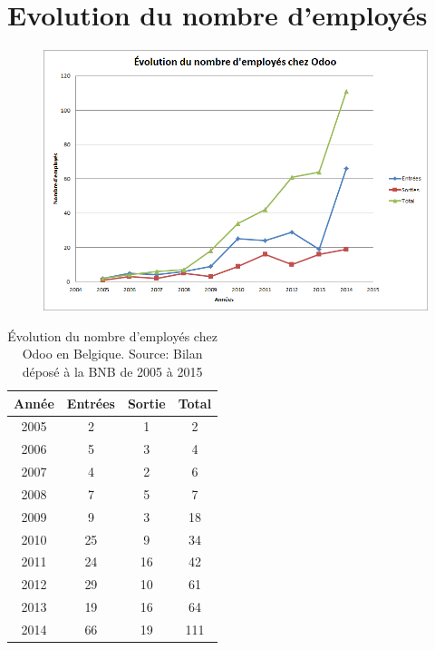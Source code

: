 \chapter{Evolution du nombre d'employés}
\begin{figure}[h!]
    \begin{center}
        \includegraphics[scale=0.6]{document/evolution.png}
        \caption{}
        \label{}
    \end{center}
\end{figure}
\begin{table}[ht!]
    \caption{ Évolution du nombre d'employés chez Odoo en Belgique. Source: Bilan déposé à la BNB de 2005 à 2015\cite{bnb}}
    \label{nb_employe}

    \begin{center}
        \begin{tabular}{|cccc|}
             \hline
             Année & Entrées & Sortie & Total \\
             \hline
             2005 & 2  & 1  & 2   \\
             2006 & 5  & 3  & 4   \\
             2007 & 4  & 2  & 6   \\
             2008 & 7  & 5  & 7   \\
             2009 & 9  & 3  & 18  \\
             2010 & 25 & 9  & 34  \\
             2011 & 24 & 16 & 42  \\
             2012 & 29 & 10 & 61  \\
             2013 & 19 & 16 & 64  \\
             2014 & 66 & 19 & 111 \\
             \hline
        \end{tabular}
    \end{center}
\end{table}




